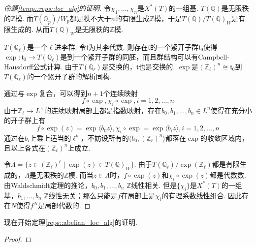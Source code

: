 \begin{proof}[命题\ref{temp::reps::loc_alg}的证明]

    令$\chi_1,\ldots,\chi_n$是$X^{*}(T)$的一组基.
    $T(\mathbb{Q})$是无限秩的$\mathbb{Z}$模.
    而$T(\mathbb{Q}_p)/W_p$都是秩不大于$n$的有限生成$\mathbb{Z}$模，于是$T(\mathbb{Q})/T(\mathbb{Q})_W$是有限生成的. 从而$T(\mathbb{Q})_W$是无限秩的$\mathbb{Z}$模.

    $T(\mathbb{Q}_{\ell})$是一个$\ell$进李群. 令$\mathfrak{t}$为其李代数. 则存在$\mathfrak{t}$的一个紧开子群$\mathfrak{t}_0$使得$\exp: \mathfrak{t}_0\to T(\mathbb{Q}_{\ell})$是到一个紧开子群的同胚，而且群结构可以有Campbell-Hausdorff公式计算. 由于$T(\mathbb{Q}_{\ell})$是交换的，$\mathfrak{t}$也是交换的. $\exp$是$(\mathbb{Z}_{\ell})^n\cong \mathfrak{t}_0$到$T(\mathbb{Q}_{\ell})$的一个紧开子群的解析同构.

    通过与$\exp$复合，可以得到$n+1$个连续映射
    \begin{equation}
        f\circ\exp, \chi_i\circ\exp, i=1,2,\ldots,n
    \end{equation}
    由于$\mathbb{Z}_{\ell}\to L^{\times}$的连续映射局部上都是指数映射，存在$b_0, b_1,\ldots,b_n \in L^n$使得在充分小的开子群上有
    \begin{equation}
        f\circ\exp(z) = \exp \langle b_0 z\rangle, \chi_i\circ\exp = \exp\langle b_i z\rangle, i=1,2,\ldots,n
    \end{equation}
    通过在$b_i$上乘上适当的$\ell^k$，不妨设所有的$\langle b_0, (\mathbb{Z}_{\ell})^n\rangle$都落在$\exp$的收敛区域内，且以上各式在$(\mathbb{Z}_{\ell})^n$上成立.

    令$\Lambda = \{z\in (\mathbb{Z}_{\ell})^{\ell}\mid \exp(z)\in T(\mathbb{Q})_{W}\}$. 由于$T(\mathbb{Q}_{\ell})/\exp(\mathbb{Z}_{\ell})$都是有限生成的，$\Lambda$是无限秩的$\mathbb{Z}$模. 而当$z\in \Lambda$时，$f\circ \exp(z)$和$\chi_i\circ\exp(z)$都是代数数. 由Waldschmidt定理的推论，$b_0,b_1,\ldots,b_n$ $\mathbb{Z}$线性相关. 但是$\{\chi_i\}$是$X^{*}(T)$的一组基，$b_1,\ldots,b_n$ $\mathbb{Z}$线性无关；那么只能是$f$在局部上是$\chi_i$的有理系数线性组合. 因此存在$N$使得$f^N$是局部代数的.

\end{proof}

现在开始定理\ref{reps::abelian_loc_alg}的证明.
\begin{proof}
    
\end{proof}
